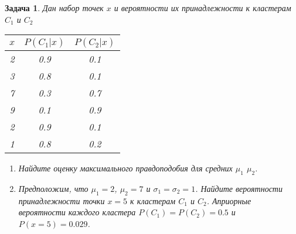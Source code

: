 \documentclass[12pt,a4paper]{article}
\newtheorem{task}[theorem]{Задача}
\begin{document}
\begin{task}
  Дан набор точек $x$ и вероятности их принадлежности к кластерам $C_1$ и $C_2$

  \begin{center}
    \begin{tabular}{|c|c|c|}
      \hline
      $x$ & $P(C_1|x)$ & $P(C_2|x)$ \\
      \hline
      2 & 0.9 & 0.1 \\
      3 & 0.8 & 0.1 \\
      7 & 0.3 & 0.7 \\
      9 & 0.1 & 0.9 \\
      2 & 0.9 & 0.1 \\
      1 & 0.8 & 0.2 \\
      \hline
    \end{tabular}
  \end{center}

  \begin{enumerate}[label=\Alph*., leftmargin=4\parindent]
    \item Найдите оценку максимального правдоподобия для средних $\mu_1$ $\mu_2$.
    \item Предположим, что $\mu_1=2$, $\mu_2=7$ и $\sigma_1=\sigma_2=1$.
          Найдите вероятности принадлежности точки $x=5$ к кластерам $C_1$ и $C_2$.
          Априорные вероятности каждого кластера $P(C_1)=P(C_2)=0.5$ и $P(x=5)=0.029$.
  \end{enumerate}
\end{task}
\end{document}
